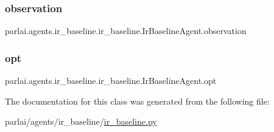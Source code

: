 \subsubsection{\texorpdfstring{observation}{observation}}
{\footnotesize\ttfamily parlai.\+agents.\+ir\+\_\+baseline.\+ir\+\_\+baseline.\+Ir\+Baseline\+Agent.\+observation}

\mbox{\label{classparlai_1_1agents_1_1ir__baseline_1_1ir__baseline_1_1IrBaselineAgent_a2c83d3c7e15884871dbfabea9f110933}} 
\subsubsection{\texorpdfstring{opt}{opt}}
{\footnotesize\ttfamily parlai.\+agents.\+ir\+\_\+baseline.\+ir\+\_\+baseline.\+Ir\+Baseline\+Agent.\+opt}



The documentation for this class was generated from the following file\+:\begin{DoxyCompactItemize}
\item 
parlai/agents/ir\+\_\+baseline/\hyperlink{ir__baseline_8py}{ir\+\_\+baseline.\+py}\end{DoxyCompactItemize}
